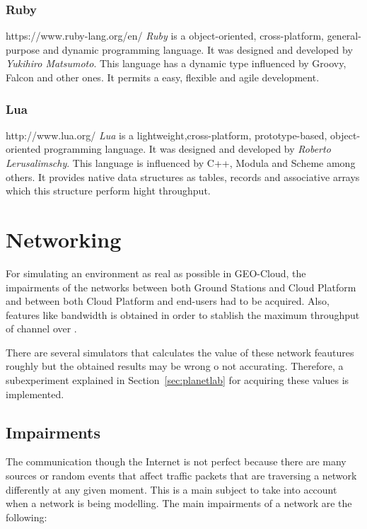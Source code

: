 \subsubsection{Ruby}
https://www.ruby-lang.org/en/
\emph{Ruby} is a object-oriented, cross-platform, general-purpose and dynamic
programming language. It was designed and developed by \emph{Yukihiro
  Matsumoto}. This language has a dynamic type influenced by Groovy, Falcon and
other ones. It permits a easy, flexible and agile development. 


\subsubsection{Lua}
http://www.lua.org/
\emph{Lua} is a lightweight,cross-platform, prototype-based, object-oriented programming
language. It was designed and developed by \emph{Roberto Lerusalimschy}. This
language is influenced by C++, Modula and Scheme among others. It provides
native data structures as tables, records and associative arrays which this
structure perform hight throughput.


\section{Networking}

For simulating an environment as real as possible in GEO-Cloud, the impairments  of the networks between both Ground Stations and Cloud Platform
and between both Cloud Platform and end-users had to be acquired. Also, features
like bandwidth is obtained in order to stablish the maximum throughput of
channel over \vw.

There are several simulators that
calculates the value of these network feautures roughly but the obtained results
may be wrong o not accurating. Therefore, a subexperiment explained in
Section~\ref{sec:planetlab} for acquiring these values is implemented. 

\subsection{Impairments}

The communication though the Internet is not perfect because there are many
sources or random events that affect traffic packets that are traversing a
network differently at any given moment. This is a main
subject to take into account when a network is being modelling. The main
impairments
 of a network are the following:

